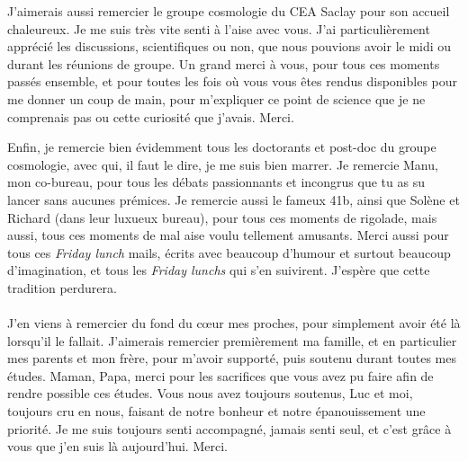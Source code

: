 J'aimerais aussi remercier le groupe cosmologie du CEA Saclay pour son accueil chaleureux. Je me suis très vite senti à l'aise avec vous. J'ai particulièrement apprécié les discussions, scientifiques ou non, que nous pouvions avoir le midi ou durant les réunions de groupe. Un grand merci à vous, pour tous ces moments passés ensemble, et pour toutes les fois où vous vous êtes rendus disponibles pour me donner un coup de main, pour m'expliquer ce point de science que je ne comprenais pas ou cette curiosité que j'avais. Merci.

Enfin, je remercie bien évidemment tous les doctorants et post-doc du groupe cosmologie, avec qui, il faut le dire, je me suis bien marrer. Je remercie Manu, mon co-bureau, pour tous les débats passionnants et incongrus que tu as su lancer sans aucunes prémices. Je remercie aussi le fameux 41b, ainsi que Solène et Richard (dans leur luxueux bureau), pour tous ces moments de rigolade, mais aussi, tous ces moments de mal aise voulu tellement amusants. Merci aussi pour tous ces \emph{Friday lunch} mails, écrits avec beaucoup d'humour et surtout beaucoup d'imagination, et tous les \emph{Friday lunchs} qui s'en suivirent. J'espère que cette tradition perdurera.

\paragraph{}
J'en viens à remercier du fond du cœur mes proches, pour simplement avoir été là lorsqu'il le fallait.
J'aimerais remercier premièrement ma famille, et en particulier mes parents et mon frère, pour m'avoir supporté, puis soutenu durant toutes mes études. Maman, Papa, merci pour les sacrifices que vous avez pu faire afin de rendre possible ces études. Vous nous avez toujours soutenus, Luc et moi, toujours cru en nous, faisant de notre bonheur et notre épanouissement une priorité. Je me suis toujours senti accompagné, jamais senti seul, et c'est grâce à vous que j'en suis là aujourd'hui. Merci.

